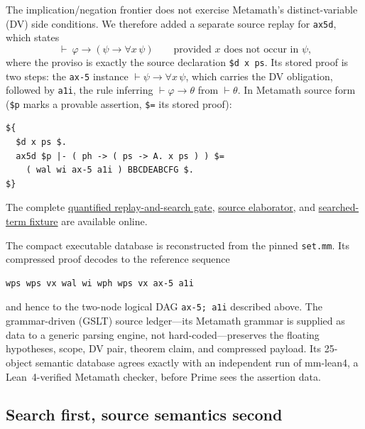 \documentclass[10pt]{article}
\begin{document}
The implication/negation frontier does not exercise Metamath's
distinct-variable (DV) side conditions.  We therefore added a separate source
replay for \texttt{ax5d}, which states
\[
\vdash\ \varphi\to(\psi\to\forall x\,\psi)
\qquad\text{provided $x$ does not occur in $\psi$,}
\]
where the proviso is exactly the source declaration \texttt{\$d x ps}.  Its
stored proof is two steps: the \texttt{ax-5} instance
$\vdash\psi\to\forall x\,\psi$, which carries the DV obligation, followed by
\texttt{a1i}, the rule inferring $\vdash\varphi\to\theta$ from
$\vdash\theta$.  In Metamath source form (\texttt{\$p} marks a provable
assertion, \texttt{\$=} its stored proof):

\begin{lstlisting}
${
  $d x ps $.
  ax5d $p |- ( ph -> ( ps -> A. x ps ) ) $=
    ( wal wi ax-5 a1i ) BBCDEABCFG $.
$}
\end{lstlisting}

The complete
\href{https://github.com/zariuq/MeTTapedia/blob/prime-atp-pcxp-20260718/MettaKernel/kernel/pcxp_trace_certification/run_setmm_prime_quantified_ax5d_v0_gate.sh}
{quantified replay-and-search gate},
\href{https://github.com/zariuq/MeTTapedia/blob/prime-atp-pcxp-20260718/MettaKernel/kernel/pcxp_trace_certification/setmm_quantified_ax5d_tools.py}
{source elaborator}, and
\href{https://github.com/zariuq/MeTTapedia/blob/prime-atp-pcxp-20260718/MettaKernel/kernel/pcxp_trace_certification/setmm_prime_quantified_ax5d_search_v0.metta}
{searched-term fixture} are available online.

The compact executable database is reconstructed from the pinned
\texttt{set.mm}.  Its compressed proof decodes to the reference sequence

\begin{lstlisting}
wps wps vx wal wi wph wps vx ax-5 a1i
\end{lstlisting}

and hence to the two-node logical DAG \texttt{ax-5; a1i} described above.
The grammar-driven (GSLT) source ledger---its Metamath grammar is supplied as
data to a generic parsing engine, not hard-coded---preserves the floating
hypotheses, scope, DV pair, theorem claim, and compressed payload.  Its
25-object semantic database agrees exactly with an independent run of
mm-lean4, a Lean~4-verified Metamath checker, before Prime sees the
assertion data.

\subsection{Search first, source semantics second}
\end{document}
